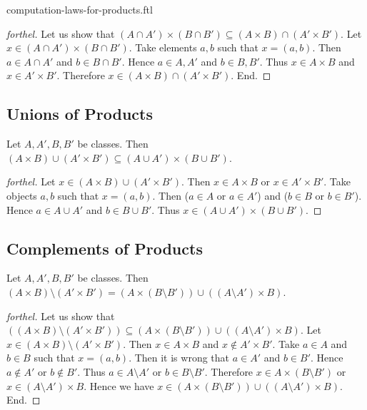 \documentclass{naproche-library}
\begin{document}
\begin{smodule}{computation-laws-for-products.ftl}
\begin{proof}[forthel]
    Let us show that $(A \cap A') \times (B \cap B') \subseteq (A \times B) \cap (A' \times B')$.
      Let $x \in (A \cap A') \times (B \cap B')$.
      Take elements $a, b$ such that $x = (a, b)$.
      Then $a \in A \cap A'$ and $b \in B \cap B'$.
      Hence $a \in A, A'$ and $b \in B, B'$.
      Thus $x \in A \times B$ and $x \in A' \times B'$.
      Therefore $x \in (A \times B) \cap (A' \times B')$.
    End.
  \end{proof}


  \subsection*{Unions of Products}

  \begin{proposition}[forthel,id=FOUNDATIONS_05_7090174334861312]
    Let $A, A', B, B'$ be classes.
    Then $(A \times B) \cup (A' \times B') \subseteq (A \cup A') \times (B \cup B')$.
  \end{proposition}
  \begin{proof}[forthel]
    Let $x \in (A \times B) \cup (A' \times B')$.
    Then $x \in A \times B$ or $x \in A' \times B'$.
    Take objects $a, b$ such that $x = (a, b)$.
    Then ($a \in A$ or $a \in A'$) and ($b \in B$ or $b \in B'$).
    Hence $a \in A \cup A'$ and $b \in B \cup B'$.
    Thus $x \in (A \cup A') \times (B \cup B')$.
  \end{proof}


  \subsection*{Complements of Products}

  \begin{proposition}[forthel,id=FOUNDATIONS_05_5552125989879808]
    Let $A, A', B, B'$ be classes.
    Then $(A \times B) \setminus (A' \times B') = (A \times (B \setminus B')) \cup ((A \setminus A') \times B)$.
  \end{proposition}
  \begin{proof}[forthel]
    Let us show that $((A \times B) \setminus (A' \times B')) \subseteq (A \times (B \setminus B')) \cup ((A \setminus A') \times B)$.
      Let $x \in (A \times B) \setminus (A' \times B')$.
      Then $x \in A \times B$ and $x \notin A' \times B'$.
      Take $a \in A$ and $b \in B$ such that $x = (a, b)$.
      Then it is wrong that $a \in A'$ and $b \in B'$.
      Hence $a \notin A'$ or $b \notin B'$.
      Thus $a \in A \setminus A'$ or $b \in B \setminus B'$.
      Therefore $x \in A \times (B \setminus B')$ or $x \in (A \setminus A') \times B$.
      Hence we have $x \in (A \times (B \setminus B')) \cup ((A \setminus A') \times B)$.
    End.


\end{proof}
\end{smodule}
\end{document}
